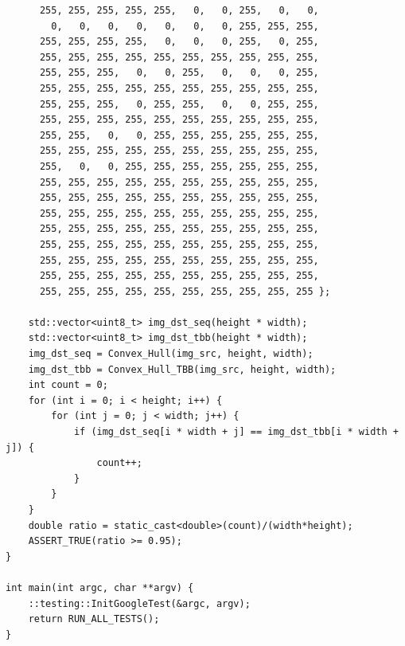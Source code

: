 \documentclass{report}
\begin{document}
\begin{lstlisting}
      255, 255, 255, 255, 255,   0,   0, 255,   0,   0,
        0,   0,   0,   0,   0,   0,   0, 255, 255, 255,
      255, 255, 255, 255,   0,   0,   0, 255,   0, 255,
      255, 255, 255, 255, 255, 255, 255, 255, 255, 255,
      255, 255, 255,   0,   0, 255,   0,   0,   0, 255,
      255, 255, 255, 255, 255, 255, 255, 255, 255, 255,
      255, 255, 255,   0, 255, 255,   0,   0, 255, 255,
      255, 255, 255, 255, 255, 255, 255, 255, 255, 255,
      255, 255,   0,   0, 255, 255, 255, 255, 255, 255,
      255, 255, 255, 255, 255, 255, 255, 255, 255, 255,
      255,   0,   0, 255, 255, 255, 255, 255, 255, 255,
      255, 255, 255, 255, 255, 255, 255, 255, 255, 255,
      255, 255, 255, 255, 255, 255, 255, 255, 255, 255,
      255, 255, 255, 255, 255, 255, 255, 255, 255, 255,
      255, 255, 255, 255, 255, 255, 255, 255, 255, 255,
      255, 255, 255, 255, 255, 255, 255, 255, 255, 255,
      255, 255, 255, 255, 255, 255, 255, 255, 255, 255,
      255, 255, 255, 255, 255, 255, 255, 255, 255, 255,
      255, 255, 255, 255, 255, 255, 255, 255, 255, 255 };

    std::vector<uint8_t> img_dst_seq(height * width);
    std::vector<uint8_t> img_dst_tbb(height * width);
    img_dst_seq = Convex_Hull(img_src, height, width);
    img_dst_tbb = Convex_Hull_TBB(img_src, height, width);
    int count = 0;
    for (int i = 0; i < height; i++) {
        for (int j = 0; j < width; j++) {
            if (img_dst_seq[i * width + j] == img_dst_tbb[i * width + j]) {
                count++;
            }
        }
    }
    double ratio = static_cast<double>(count)/(width*height);
    ASSERT_TRUE(ratio >= 0.95);
}

int main(int argc, char **argv) {
    ::testing::InitGoogleTest(&argc, argv);
    return RUN_ALL_TESTS();
}

\end{lstlisting}
\end{document}
